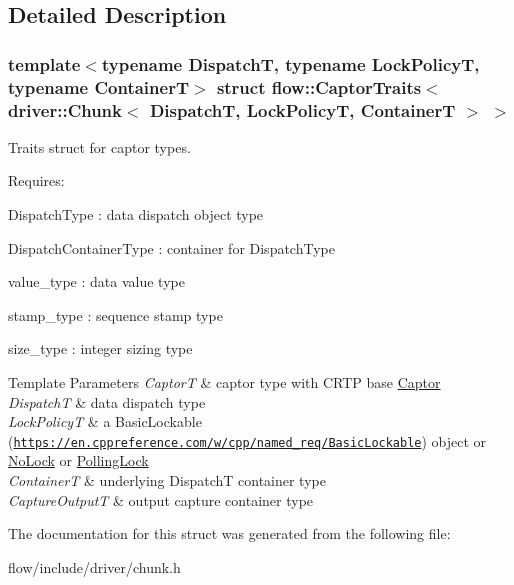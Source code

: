 \subsection{Detailed Description}
\subsubsection*{template$<$typename DispatchT, typename Lock\+PolicyT, typename ContainerT$>$\newline
struct flow\+::\+Captor\+Traits$<$ driver\+::\+Chunk$<$ Dispatch\+T, Lock\+Policy\+T, Container\+T $>$ $>$}

Traits struct for captor types. 

Requires\+:
\begin{DoxyItemize}
\item {\ttfamily Dispatch\+Type} \+: data dispatch object type
\item {\ttfamily Dispatch\+Container\+Type} \+: container for {\ttfamily Dispatch\+Type}
\item {\ttfamily value\+\_\+type} \+: data value type
\item {\ttfamily stamp\+\_\+type} \+: sequence stamp type
\item {\ttfamily size\+\_\+type} \+: integer sizing type
\end{DoxyItemize}


\begin{DoxyTemplParams}{Template Parameters}
{\em CaptorT} & captor type with C\+R\+TP base {\ttfamily \hyperlink{classflow_1_1_captor}{Captor}}\\
\hline
{\em DispatchT} & data dispatch type \\
\hline
{\em Lock\+PolicyT} & a Basic\+Lockable (\href{https://en.cppreference.com/w/cpp/named_req/BasicLockable}{\tt https\+://en.\+cppreference.\+com/w/cpp/named\+\_\+req/\+Basic\+Lockable}) object or \hyperlink{structflow_1_1_no_lock}{No\+Lock} or \hyperlink{structflow_1_1_polling_lock}{Polling\+Lock} \\
\hline
{\em ContainerT} & underlying {\ttfamily DispatchT} container type \\
\hline
{\em Capture\+OutputT} & output capture container type \\
\hline
\end{DoxyTemplParams}


The documentation for this struct was generated from the following file\+:\begin{DoxyCompactItemize}
\item 
flow/include/driver/chunk.\+h\end{DoxyCompactItemize}
